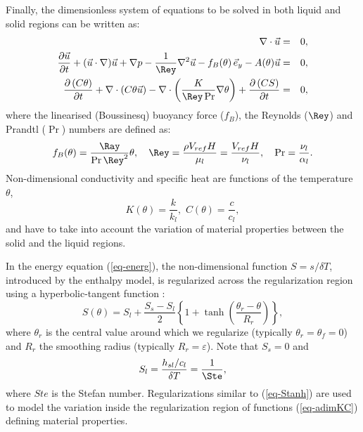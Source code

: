 Finally, the dimensionless system of equations to be solved in both liquid and solid regions can be written as:
\begin{eqnarray}
\nabla\cdot \vec{u}&=&0, \label{eq-qmvt} \\ \vspace{0.2cm}
 \frac{\partial \vec{u}}{\partial t} + {(\vec{u}\cdot\nabla) \vec{u}} +\nabla p -\frac{1}{\Rey}{\nabla^2 \vec{u}} 
 - f_B(\theta)\, \vec{e}_y - A(\theta) \vec{u}&=&0, \label{eq-qmvt-2} \\ \vspace{0.2cm}
 \frac{\partial \left(C \theta\right)}{\partial t} + \nabla \cdot\left( C \theta \vec{u}\right) -
 \nabla \cdot\left( \frac{K}{\Rey \Pr} \nabla \theta \right) +  \frac{\partial \left(C S\right)}{\partial t}  &=& 0, \label{eq-energ} 
\end{eqnarray}
where the linearised (Boussinesq) buoyancy force ($f_B$), the Reynolds ($\Rey$) and Prandtl ($\Pr$) numbers are defined as:
\begin{equation}\label{eq-RePr}
f_B(\theta) = \frac{\Ray}{\Pr \Rey^2} \theta, \quad \Rey = \frac{\rho V_{ref} H}{\mu_l}=  \frac{V_{ref} H}{\nu_l} , \quad \Pr = \frac{\nu_l}{\alpha_l}.
\end{equation}
Non-dimensional conductivity and specific heat are functions of the temperature $\theta$, 
\begin{equation}\label{eq-adimKC}
K(\theta)= \frac{k}{k_l} , \,  \, C(\theta) = \frac{c}{c_l},
\end{equation}
and have to take into account the variation of material properties between the solid and the liquid regions. 

In the energy equation (\ref{eq-energ}), the non-dimensional function $S = s/\delta T$, introduced by the enthalpy model, is regularized across the regularization region using a hyperbolic-tangent function \citep{dan-2014-JCP}:
\begin{equation}
S(\theta) = S_{l} + \frac{S_{s}-S_{l}}{2}\left\{
1 + \tanh\left(\frac{\theta_r-\theta}{R_r}\right)
\right\},
\label{eq-Stanh}
\end{equation} 
where $\theta_r$ is the central value around which we regularize (typically $\theta_r=\theta_f=0$) and $R_r$ the smoothing radius (typically $R_r=\varepsilon$). Note that $S_{s} = 0$ and
\begin{equation}
S_{l} = \frac{h_{sl}/c_l}{\delta T} = \frac{1}{\Ste},
\label{eq-Ste}
\end{equation} 
where $Ste$ is the Stefan number. Regularizations similar to (\ref{eq-Stanh}) are used to model the variation inside the regularization region of functions (\ref{eq-adimKC}) defining material properties.

